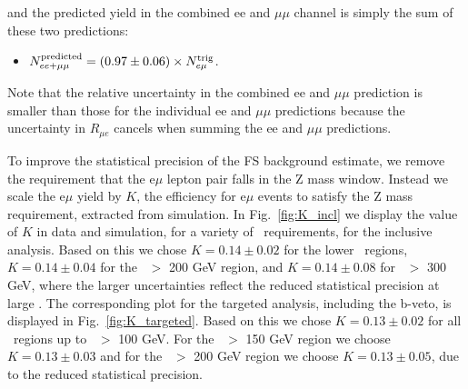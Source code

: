 and the predicted yield in the combined ee and $\mu\mu$ channel is simply the sum of these two predictions:

\begin{itemize}
\item $N_{ee+\mu\mu}^{\rm{predicted}} = (0.97\pm0.06)\times N_{e\mu}^{\rm{trig}}$.
\end{itemize}

Note that the relative uncertainty in the combined ee and $\mu\mu$ prediction is smaller than those for the individual ee and $\mu\mu$ predictions
because the uncertainty in $R_{\mu e}$ cancels when summing the ee and $\mu\mu$ predictions. %

To improve the statistical precision of the FS background estimate, we remove the requirement that the e$\mu$ lepton pair falls in the Z mass window.
Instead we scale the e$\mu$ yield by $K$, the efficiency for e$\mu$ events to satisfy the Z mass requirement, extracted from simulation. In Fig.~\ref{fig:K_incl}
we display the value of $K$ in data and simulation, for a variety of \MET\ requirements, for the inclusive analysis. 
Based on this we chose $K=0.14\pm0.02$ for the lower \MET\ regions, $K=0.14\pm0.04$ for the \MET\ $>$ 200 GeV region, and $K=0.14\pm0.08$ for \MET\ $>$ 300 GeV,
where the larger uncertainties reflect the reduced statistical precision at large \MET.
The corresponding plot for the targeted analysis, including the b-veto, is displayed in Fig.~\ref{fig:K_targeted}.
Based on this we chose $K=0.13\pm0.02$ for all \MET\ regions up to  \MET\ $>$ 100 GeV. 
For the \MET\ $>$ 150 GeV region we choose $K=0.13\pm0.03$
and for the \MET\ $>$ 200 GeV region we choose $K=0.13\pm0.05$, 
due to the reduced  statistical precision.

